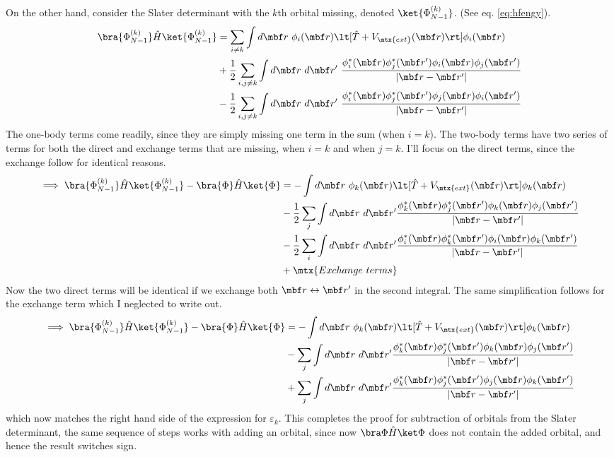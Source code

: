 \documentclass[10pt]{article}
\begin{document}
  On the other hand, consider the Slater determinant with the $k$th orbital
  missing, denoted $\ket{\Phi_{N-1}^{(k)}}$. (See eq. \ref{eq:hfengy}).
  \begin{align*}
    \bra{\Phi_{N-1}^{(k)}} \hat H \ket{\Phi_{N-1}^{(k)}}
    &=
    \sum_{i \ne k} \int d\mbf r~\phi_i(\mbf r) \lt[
      \hat T + V_\mtx{ext}(\mbf r) 
    \rt] \phi_i(\mbf r)
    \\
    &+
    \frac 12 \sum_{i,j\ne k}\int d\mbf r~d\mbf r'~
    \frac{\phi_i^*(\mbf r) \phi_j^*(\mbf r') \phi_i(\mbf r) \phi_j(\mbf r')}
    {|\mbf r - \mbf r'|}
    \\
    &-
    \frac 12 \sum_{i,j\ne k}\int d\mbf r~d\mbf r'~
    \frac{\phi_i^*(\mbf r) \phi_j^*(\mbf r') \phi_j(\mbf r) \phi_i(\mbf r')}
    {|\mbf r - \mbf r'|}
  \end{align*}
  The one-body terms come readily, since they are simply missing one term in the
  sum (when $i = k$). The two-body terms have two series of terms for both the
  direct and exchange terms that are missing, when $i=k$ and when $j=k$. I'll
  focus on the direct terms, since the exchange follow for identical reasons.
  \begin{align*}
    \implies
    \bra{\Phi_{N-1}^{(k)}} \hat H \ket{\Phi_{N-1}^{(k)}} - \bra{\Phi} \hat H \ket{\Phi}
    &=
    -\int d\mbf r~\phi_k(\mbf r) \lt[
      \hat T + V_\mtx{ext}(\mbf r) 
    \rt] \phi_k(\mbf r)
    \\
    &-
    \frac 12 \sum_j \int d\mbf r~d\mbf r'
    \frac{\phi_k^*(\mbf r) \phi_j^*(\mbf r') \phi_k(\mbf r) \phi_j(\mbf r')}
    {|\mbf r - \mbf r'|}
    \\
    &-
    \frac 12 \sum_i \int d\mbf r~d\mbf r'
    \frac{\phi_i^*(\mbf r) \phi_k^*(\mbf r') \phi_i(\mbf r) \phi_k(\mbf r')}
    {|\mbf r - \mbf r'|}
    \\
    &+
    \mtx{Exchange~terms}
  \end{align*}
  Now the two direct terms will be identical if we exchange both $\mbf r
  \leftrightarrow \mbf r'$ in the second integral. The same simplification follows
  for the exchange term which I neglected to write out.
  \begin{align*}
    \implies
    \bra{\Phi_{N-1}^{(k)}} \hat H \ket{\Phi_{N-1}^{(k)}} - \bra{\Phi} \hat H \ket{\Phi}
    &=
    -\int d\mbf r~\phi_k(\mbf r) \lt[
      \hat T + V_\mtx{ext}(\mbf r) 
    \rt] \phi_k(\mbf r)
    \\
    &-
    \sum_j \int d\mbf r~d\mbf r'
    \frac{\phi_k^*(\mbf r) \phi_j^*(\mbf r') \phi_k(\mbf r) \phi_j(\mbf r')}
    {|\mbf r - \mbf r'|}
    \\
    &+
    \sum_j \int d\mbf r~d\mbf r'
    \frac{\phi_k^*(\mbf r) \phi_j^*(\mbf r') \phi_j(\mbf r) \phi_k(\mbf r')}
    {|\mbf r - \mbf r'|}
  \end{align*}
  which now matches the right hand side of the expression for $\varepsilon_k$.
  This completes the proof for subtraction of orbitals from the Slater
  determinant, the same sequence of steps works with adding an orbital, since now
  $\bra \Phi \hat H \ket \Phi$ does not contain the added orbital, and hence the
  result switches sign.
\end{document}
